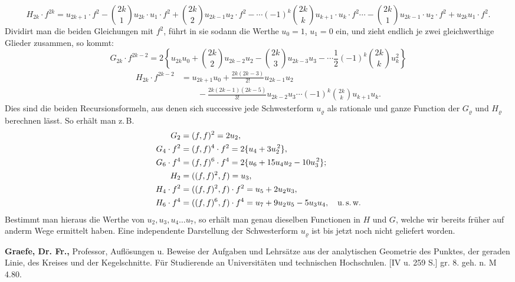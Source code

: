 {\scriptsize
\[
H_{2k}\cdot f^{2k} = u_{2k+1}\cdot f^2 - \binom{2k}{1}u_{2k}\cdot u_1\cdot f^2+\binom{2k}{2}u_{2k-1}u_2\cdot f^2
-\cdots(-1)^k\binom{2k}{k}u_{k+1}\cdot u_k\cdot f^2\cdots-\binom{2k}{1}u_{2k-1}\cdot u_2\cdot f^2+u_{2k}u_1\cdot f^2.
\]
}
Dividirt man die beiden Gleichungen mit $f^2$, führt in sie sodann die
Werthe $u_0=1$, $u_1=0$ ein, und zieht endlich je zwei gleichwerthige
Glieder zusammen, so kommt:
\[
G_{2k}\cdot f^{2k-2} = 2\left\{u_{2k}u_0+\binom{2k}{2}u_{2k-2}u_2-\binom{2k}{3}u_{2k-3}u_3-\cdots\frac{1}{2}(-1)^k\binom{2k}{k}u_k^2\right\}
\]
\[
\begin{aligned}
H_{2k}\cdot f^{2k-2} &= u_{2k+1}u_0 + \frac{2k(2k-3)}{2!}u_{2k-1}u_2\\
&\qquad -\frac{2k(2k-1)(2k-5)}{3!}u_{2k-2}u_3\cdots(-1)^k\binom{2k}{k}u_{k+1}u_k.
\end{aligned}
\]
Dies sind die beiden Recursionsformeln, aus denen sich successive jede
Schwesterform $u_\varrho$ als rationale und ganze Function der $G_\varrho$ und
$H_\varrho$ berechnen lässt. So erhält man z.\,B.
\[
\begin{aligned}
G_2 &= (f,f)^2 = 2u_2,\\
G_4\cdot f^2 &= (f,f)^4\cdot f^2 = 2\{u_4+3u_2^{\,2}\},\\
G_6\cdot f^4 &= (f,f)^6\cdot f^4 = 2\{u_6+15u_4u_2-10u_3^{\,2}\};\\
H_2 &= ((f,f)^2,f) = u_3,\\
H_4\cdot f^2 &= ((f,f)^2,f)\cdot f^2 = u_5+2u_2u_3,\\
H_6\cdot f^4 &= ((f,f)^6,f)\cdot f^4 = u_7+9u_2u_5-5u_3u_4,\quad \text{u.\,s.\,w.}
\end{aligned}
\]
Bestimmt man hieraus die Werthe von $u_2, u_3, u_4\dots u_7$, so erhält
man genau dieselben Functionen in $H$ und $G$, welche wir bereits
früher auf anderm Wege ermittelt haben. Eine independente
Darstellung der Schwesterform $u_\varrho$ ist bis jetzt noch nicht geliefert
worden.



\textbf{Graefe, Dr. Fr.,} Professor, Auflösungen u. Beweise der Aufgaben und Lehrsätze
aus der analytischen Geometrie des Punktes, der geraden Linie, des Kreises und der
Kegelschnitte. Für Studierende an Universitäten und technischen Hochschulen.
[IV u. 259 S.] gr. 8. geh. n. M 4.80.

